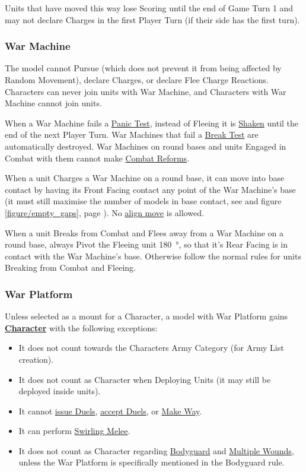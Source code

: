 Units that have moved this way lose Scoring until the end of Game Turn 1 and may not declare Charges in the first Player Turn (if their side has the first turn).

\subsubsection{War Machine}
\idx[main=y]{\warmachine}\label{war_machine}

The model cannot Pursue (which does not prevent it from being affected by Random Movement), declare Charges, or declare Flee Charge Reactions. Characters can never join units with War Machine, and Characters with War Machine cannot join units.

When a War Machine fails a \hyperref[panic_test]{Panic Test}, instead of Fleeing it is \hyperref[shaken]{Shaken} until the end of the next Player Turn. War Machines that fail a \hyperref[break_test]{Break Test} are automatically destroyed. War Machines on round bases and units Engaged in Combat with them cannot make \hyperref[combat_reform]{Combat Reforms}.

When a unit Charges a War Machine on a round base, it can move into base contact by having its Front Facing contact any point of the War Machine's base (it must still maximise the number of models in base contact, see  and figure \ref{figure/empty_gaps}, page \pageref{figure/empty_gaps}). No \hyperref[aligning_units]{align move} is allowed.

When a unit Breaks from Combat and Flees away from a War Machine on a round base, always Pivot the Fleeing unit \SI{180}{\degree}, so that it's Rear Facing is in contact with the War Machine's base. Otherwise follow the normal rules for units Breaking from Combat and Fleeing.

\subsubsection{War Platform}
\idx[main=y]{\warplatform}\label{war_platform}

Unless selected as a mount for a Character, a model with War Platform gains \hyperref[characters]{\textbf{Character}} with the following exceptions:

\begin{itemize}
\item It does not count towards the Characters Army Category (for Army List creation).
\item It does not count as Character when Deploying Units (it may still be deployed inside units).
\item It cannot \hyperref[issuing_a_duel]{issue Duels}, \hyperref[accepting_and_refusing_a_duel]{accept Duels}, or \hyperref[make_way]{Make Way}.
\item It can perform \hyperref[swirling_melee]{Swirling Melee}.
\item It does not count as Character regarding \hyperref[bodyguard]{Bodyguard} and \hyperref[multiple_wounds]{Multiple Wounds}, unless the War Platform is specifically mentioned in the Bodyguard rule.
\end{itemize}

